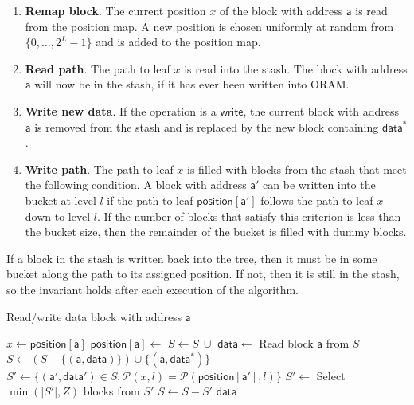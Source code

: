 \documentclass[12pt,a4paper,twoside,openright]{report}
\begin{document}
\begin{enumerate}
    \item \textbf{Remap block}. The current position $x$ of the block with address $\mathsf{a}$ is read from the position map. A new position is chosen uniformly at random from $\{0,\dots,2^L-1\}$ and is added to the position map.
    \item \textbf{Read path}. The path to leaf $x$ is read into the stash. The block with address $\mathsf{a}$ will now be in the stash, if it has ever been written into ORAM.
    \item \textbf{Write new data}. If the operation is a $\mathsf{write}$, the current block with address $\mathsf{a}$ is removed from the stash and is replaced by the new block containing $\mathsf{data^\ast}$.
    \item \textbf{Write path}. The path to leaf $x$ is filled with blocks from the stash that meet the following condition. A block with address $\mathsf{a'}$ can be written into the bucket at level $l$ if the path to leaf $\mathsf{position[a']}$ follows the path to leaf $x$ down to level $l$. If the number of blocks that satisfy this criterion is less than the bucket size, then the remainder of the bucket is filled with dummy blocks.
\end{enumerate}

If a block in the stash is written back into the tree, then it must be in some bucket along the path to its assigned position. If not, then it is still in the stash, so the invariant holds after each execution of the algorithm.

\begin{algorithm}[h]
\caption{Read/write data block with address $\mathsf{a}$}
\label{alg:access}
\footnotesize
\begin{algorithmic}[1]
    \vskip 10pt
    \vskip 10pt
    \State $x \gets \mathsf{position[a]}$
    \State $\mathsf{position[a]} \gets$ 
    \vskip 10pt
        \State $S \gets S~\cup$ 
    \EndFor
    \vskip 10pt
    \State $\mathsf{data} \gets$ Read block $\mathsf{a}$ from $S$
        \State $S \gets (S - \{(\mathsf{a,data})\}) \cup \{(\mathsf{a,data^*})\}$
    \EndIf
    \vskip 10pt
        \State $S' \gets \{(\mathsf{a',data'}) \in S : \mathcal{P}(x,l) = \mathcal{P}(\mathsf{position[a']},l)\}$
        \State $S' \gets$ Select $\min(|S'|,Z)$ blocks from $S'$
        \State $S \gets S - S'$
        \State {}
    \EndFor
    \vskip 10pt
    \State \Return $\mathsf{data}$
    \vskip 10pt
    \EndFunction
    \vskip 10pt
\end{algorithmic}
\end{algorithm}
\end{document}
